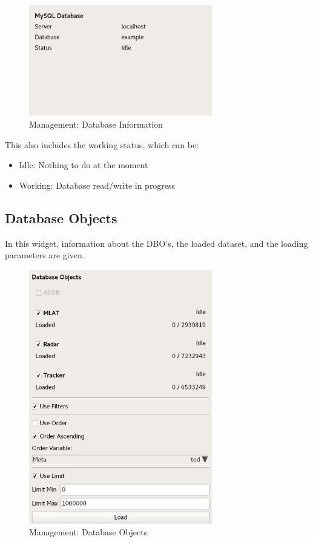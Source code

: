 \documentclass[10pt,letterpaper,extrafontsizes]{memoir}
\begin{document}
\begin{figure}[H]
  \center
    \includegraphics[width=8cm]{../screenshots/management_database.png}
  \caption{Management: Database Information}
  \label{fig:management_database}
\end{figure}

This also includes the working status, which can be:

\begin{itemize}
 \item Idle: Nothing to do at the moment
 \item Working: Database read/write in progress
\end{itemize}

\subsection{Database Objects}
\label{sec:management_dbos}

In this widget, information about the DBO's, the loaded dataset, and the loading parameters are given.

\begin{figure}[H]
  \center
    \includegraphics[width=8cm]{../screenshots/management_dbos.png}
  \caption{Management: Database Objects}
  \label{fig:management_objects}
\end{figure}
\end{document}
